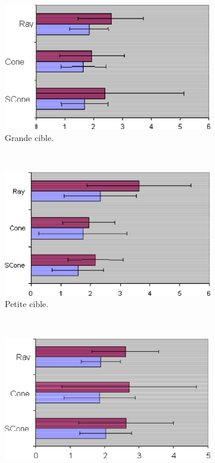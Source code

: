 	\newcommand{\subImgWmo}{0.315\textwidth}
	\begin{figure}[!htbp]
		\begin{subfigure}[t]{\subImgWmo}
			\centering
			\includegraphics[width=\textwidth]{figures/ch2/shadowSLarge}
			\caption{Grande cible.}
			\label{fig:shadowSLarge}
		\end{subfigure}
		~
		\begin{subfigure}[t]{\subImgWmo}
			\centering
			\includegraphics[width=\textwidth]{figures/ch2/shadowSSmall}
			\caption{Petite cible.}
			\label{fig:shadowSSmall}
		\end{subfigure}
		~
		\begin{subfigure}[t]{\subImgWmo}
			\centering
			\includegraphics[width=\textwidth]{figures/ch2/shadowPLarge}

\end{subfigure}
\end{figure}

